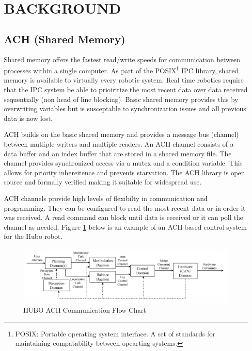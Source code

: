 \section{BACKGROUND}

\subsection{ACH (Shared Memory)}

Shared memory offers the fastest read/write speeds for communication between processes within a single computer. As part of the POSIX\footnote{POSIX: Portable operating system interface. A set of standards for maintaining compatability between opearting systems.} IPC library, shared memory is available to virtually every robotic system. Real time robotics require that the IPC system be able to prioiritize the most recent data over data received sequentially (non head of line blocking). Basic shared memory provides this by overwriting variables but is susceptable to synchronization issues and all previous data is now lost\cite{REALTIMEACH}. 

ACH builds on the basic shared memory and provides a message bus (channel) between mutliple writers and multiple readers. An ACH channel consists of a data buffer and an index buffer that are stored in a shared memory file. The channel provides synchronized access via a mutex and a condition variable. This allows for priority inhereitence and prevents starvation\cite{REALTIMEACH}. The ACH library is open source and formally verified \cite{REALTIMEACH} making it suitable for widespread use.

ACH channels provide high levels of flexibilty in communication and programming. They can be configured to read the most recent data or in order it was received. A read command can block until data is received or it can poll the channel as needed. Figure \ref{fig:ach diagram} below is an example of an ACH based control system for the Hubo robot. 

\begin{figure}[thpb]
 \centering
 \includegraphics[width=1.0\columnwidth]{./images/achflow.png}
  \caption{HUBO ACH Communication Flow Chart}
  \label{fig:ach diagram}
\end{figure} 

